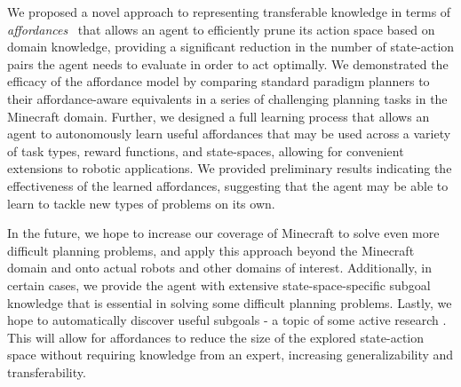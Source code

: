 \documentclass[letterpaper]{article}
\begin{document}
We proposed a novel approach to representing transferable knowledge in terms of
{\em affordances}~\cite{gibson77} that allows an agent to efficiently
prune its action space based on domain knowledge,
providing a significant reduction in the number of state-action pairs the
agent needs to evaluate in order to act optimally. We demonstrated the efficacy of the affordance model by comparing standard paradigm
planners to their affordance-aware equivalents in a series of challenging planning tasks in the Minecraft
domain. Further, we designed a full learning process that allows an agent to autonomously learn useful affordances that may be used
across a variety of task types, reward functions, and state-spaces, allowing for convenient extensions to robotic applications.
We provided preliminary results indicating the effectiveness of the learned affordances, suggesting that
the agent may be able to learn to tackle new types of problems on its own.

In the future, we hope to increase our coverage of Minecraft to solve even more difficult planning problems, and apply this
approach beyond the Minecraft domain and onto actual robots and other domains of interest. Additionally, in certain cases, we provide
the agent with extensive state-space-specific subgoal knowledge that is essential in solving some difficult planning problems. Lastly,
we hope to automatically discover useful subgoals - a topic of some active research \cite{Mcgovern01automaticdiscovery,Simsek:2005:IUS:1102351.1102454}.
This will allow for affordances to reduce the size of the explored state-action space without requiring knowledge from an expert, increasing generalizability and transferability.



\end{document}
